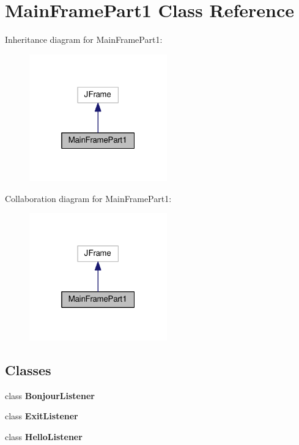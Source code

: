 \hypertarget{classMainFramePart1}{}\section{Main\+Frame\+Part1 Class Reference}
\label{classMainFramePart1}


Inheritance diagram for Main\+Frame\+Part1\+:
\nopagebreak
\begin{figure}[H]
\begin{center}
\leavevmode
\includegraphics[width=169pt]{classMainFramePart1__inherit__graph}
\end{center}
\end{figure}


Collaboration diagram for Main\+Frame\+Part1\+:
\nopagebreak
\begin{figure}[H]
\begin{center}
\leavevmode
\includegraphics[width=169pt]{classMainFramePart1__coll__graph}
\end{center}
\end{figure}
\subsection*{Classes}
\begin{DoxyCompactItemize}
\item 
class {\bfseries Bonjour\+Listener}
\item 
class {\bfseries Exit\+Listener}
\item 
class {\bfseries Hello\+Listener}
\end{DoxyCompactItemize}
